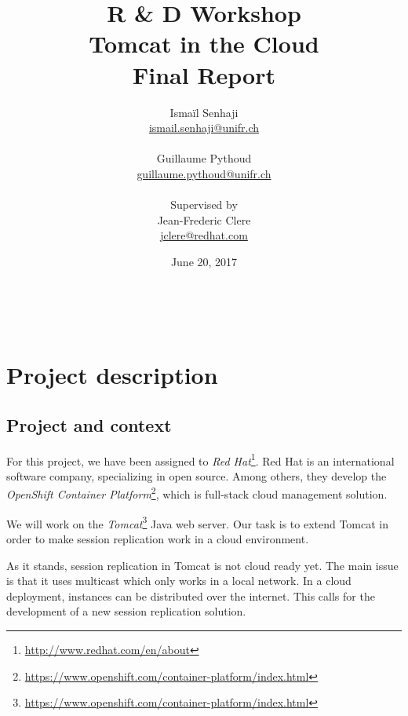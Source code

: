 \documentclass[11pt,a4paper]{article}
\title{%
    \textbf{R \& D Workshop} \\
    Tomcat in the Cloud
    \\
    \textbf{Final Report}
}
\author{%
    Ismaïl Senhaji \\
    \small \href{mailto:ismail.senhaji@unifr.ch}{ismail.senhaji@unifr.ch} \\
    \\
    Guillaume Pythoud \\
    \small \href{mailto:guillaume.pythoud@unifr.ch}{guillaume.pythoud@unifr.ch}
    \\
    \\
    Supervised by \\
    Jean-Frederic Clere \\
    \small \href{mailto:jclere@redhat.com}{jclere@redhat.com}
}
\date{June 20, 2017}
\begin{document}
\graphicspath{{fig/}}

\maketitle

\begin{figure}[b]
    \centering
    \\
\end{figure}

\newpage
\tableofcontents

\newpage


\section{Project description}

\subsection{Project and context}

For this project, we have been assigned to \emph{Red
    Hat}\footnote{\url{http://www.redhat.com/en/about}}. Red Hat is an international
software company, specializing in open source.  Among others, they develop
the \emph{OpenShift Container
    Platform}\footnote{\url{https://www.openshift.com/container-platform/index.html}},
which is full-stack cloud management solution.

We will work on the
\emph{Tomcat}\footnote{\url{https://www.openshift.com/container-platform/index.html}}
Java web server. Our task is to extend Tomcat in order to make session
replication work in a cloud environment.

As it stands, session replication in Tomcat is not cloud ready yet. The main
issue is that it uses multicast which only works in a local network. In a cloud
deployment, instances can be distributed over the internet. This calls for the
development of a new session replication solution.
\end{document}
